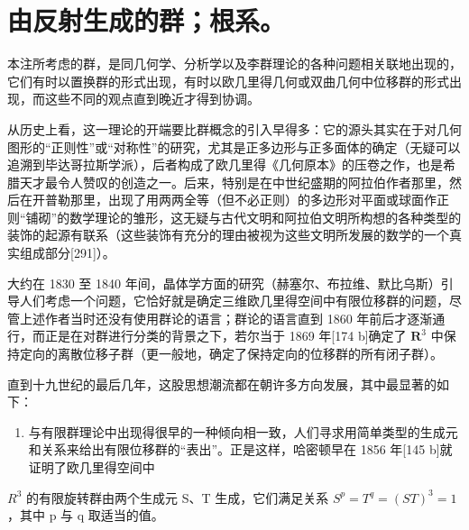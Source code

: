 \chapter{由反射生成的群；根系。}

本注所考虑的群，是同几何学、分析学以及李群理论的各种问题相关联地出现的，它们有时以置换群的形式出现，有时以欧几里得几何或双曲几何中位移群的形式出现，而这些不同的观点直到晚近才得到协调。

从历史上看，这一理论的开端要比群概念的引入早得多：它的源头其实在于对几何图形的“正则性”或“对称性”的研究，尤其是正多边形与正多面体的确定（无疑可以追溯到毕达哥拉斯学派），后者构成了欧几里得《几何原本》的压卷之作，也是希腊天才最令人赞叹的创造之一。后来，特别是在中世纪盛期的阿拉伯作者那里，然后在开普勒那里，出现了用两两全等（但不必正则）的多边形对平面或球面作正则“铺砌”的数学理论的雏形，这无疑与古代文明和阿拉伯文明所构想的各种类型的装饰的起源有联系（这些装饰有充分的理由被视为这些文明所发展的数学的一个真实组成部分{[}291{]}）。

大约在 1830 至 1840 年间，晶体学方面的研究（赫塞尔、布拉维、默比乌斯）引导人们考虑一个问题，它恰好就是确定三维欧几里得空间中有限位移群的问题，尽管上述作者当时还没有使用群论的语言；群论的语言直到 1860 年前后才逐渐通行，而正是在对群进行分类的背景之下，若尔当于 1869 年{[}174 b{]}确定了 \(\mathbf{R}^3\) 中保持定向的离散位移子群（更一般地，确定了保持定向的位移群的所有闭子群）。

直到十九世纪的最后几年，这股思想潮流都在朝许多方向发展，其中最显著的如下：

\begin{enumerate}
\def\labelenumi{\arabic{enumi}.}
\tightlist
\item
  与有限群理论中出现得很早的一种倾向相一致，人们寻求用简单类型的生成元和关系来给出有限位移群的“表出”。正是这样，哈密顿早在 1856 年{[}145 b{]}就证明了欧几里得空间中
\end{enumerate}

\(R^{3}\) 的有限旋转群由两个生成元 S、T 生成，它们满足关系 \(S^{p} = T^{q} = (ST)^{3} = 1\)，其中 p 与 q 取适当的值。

